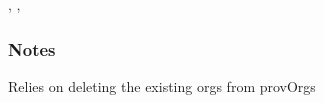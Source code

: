 \documentclass[letterpaper,10pt,english]{sphinxmanual}
\begin{document}
\begin{fulllineitems}
\begin{quote}
\begin{description}
\begin{description}
\end{description}

\end{description}\end{quote}




{\hyperref[\detokenize{accounts:gpAccounts.reviewExistingOrgs}]{}}, {\hyperref[\detokenize{accounts:gpAccounts.reviewOrgUsers}]{}}, {\hyperref[\detokenize{grafanaAPI:grafanaAPI.createOrg}]{}}


\subsubsection*{Notes}

Relies on deleting the existing orgs from provOrgs

\end{fulllineitems}

\end{document}
